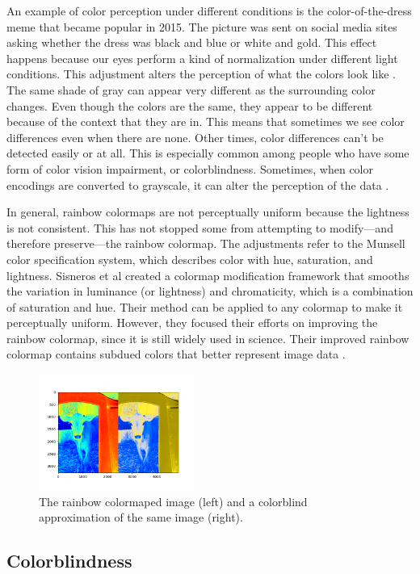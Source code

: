 \documentclass[journal,12pt]{IEEEtran}
\begin{document}
An example of color perception under different conditions is the 
color-of-the-dress meme that became popular in 2015. The picture was
sent on social media sites asking whether the dress was black and blue
or white and gold. This effect happens because our eyes perform a kind 
of normalization under different light conditions. This adjustment alters
the perception of what the colors look like \cite{viridis}.
The same shade of gray can appear very different as the surrounding color changes.
Even though the colors are the same, they appear to be 
different because of the context that they are in. This means that sometimes
we see color differences even when there are none.
Other times, color differences can't be detected easily or at all. This is 
especially common among people who have some form of color vision impairment,
or colorblindness.
Sometimes, when color encodings are converted to
grayscale, it can alter the perception of the data \cite{colorvblackwhite}.

In general, rainbow colormaps
are not perceptually uniform because the lightness is not consistent.
This has not stopped some from attempting to modify---and therefore preserve---the
rainbow colormap. The adjustments refer to the Munsell color specification system,
which describes color with hue, saturation, and lightness.
Sisneros et al created a colormap modification framework that smooths the variation
in luminance (or lightness) and chromaticity, which is a combination of saturation
and hue. Their method can be applied to any colormap to make it perceptually uniform.
However, they focused their efforts on improving the rainbow colormap, since it is still widely
used in science. Their improved rainbow colormap contains subdued colors that better
represent image data \cite{chasingrainbows}. 


\begin{figure}
\centering
\includegraphics[width=2in]{colorblind_rainbow1.png}%
\caption{The rainbow colormaped image (left) and a colorblind approximation of the same image (right).}
\end{figure}

\subsection{Colorblindness}
\end{document}
